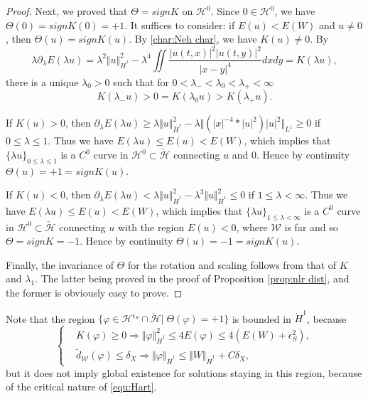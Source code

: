 \documentclass[reqno, 11pt]{amsart}
\numberwithin{equation}{section}
\theoremstyle{plain}
\theoremstyle{definition}
\numberwithin{equation}{section}
\numberwithin{theorem}{section}
\numberwithin{equation}{section}
\numberwithin{equation}{section}
\numberwithin{theorem}{section}
\begin{document}
\begin{proof}
		Next, we proved that $\Theta=signK$ on $\mathcal{H}^0$. Since $0\in \mathcal{H}^0$, we have $\Theta(0)=signK(0)=+1$. It suffices to consider: if $E(u)<E(W)$ and $u\neq0$, then $\Theta(u)=signK(u)$. By \eqref{char:Neh char}, we have $K(u)\neq0$. By 
		\begin{equation*}
		\lambda\partial_\lambda E(\lambda u)=\lambda^2\Vert u\Vert_{\dot H^1}^2-\lambda^4\iint \frac{\big|u(t,x)\big|^2\big|u(t,y)\big|^2}{|x-y|^4} dxdy=K(\lambda u),
		\end{equation*}
		there is a unique $\lambda_0>0$ such that for $0<\lambda_{-}<\lambda_0<\lambda_+<\infty$
		\begin{equation*}
		K(\lambda_{-}u)> 0=K(\lambda_0u) > K(\lambda_{+}u).
		\end{equation*}
		
		If $K(u)>0$, then $\partial_\lambda E(\lambda u)\geq \lambda\Vert u \Vert_{\dot H^1}^2-\lambda\Vert \left( |x|^{-4}*|u|^2\right)|u|^2\Vert_{L^1}\geq0$ if $0\leq\lambda\leq1$. Thus we have $E(\lambda u)\leq E(u)<E(W)$, which implies that $\{\lambda u \}_{0\leq\lambda\leq1}$ is a $C^0$ curve in $\mathcal{H}^0\subset \check{\mathcal{H}}$ connecting $u$ and 0. Hence by continuity $\Theta(u)=+1=signK(u)$.
		
		If $K(u)<0$, then $\partial_\lambda E(\lambda u)<\lambda\Vert u \Vert_{\dot H^1}^2-\lambda^3\Vert u \Vert_{\dot H^1}^2\leq0$ if $1\leq\lambda<\infty$. Thus we have $E(\lambda u)\leq E(u)<E(W)$, which implies that $\{\lambda u \}_{1\leq\lambda<\infty}$ is a $C^0$ curve in $\mathcal{H}^0\subset \check{\mathcal{H}}$ connecting $u$ with the region $E(u)<0$, where $\mathcal{W}$ is far and so $\Theta=signK=-1$. Hence by continuity $\Theta(u)=-1=signK(u)$.
		
		Finally, the invariance of $\Theta$ for the rotation and scaling follows from that of $K$ and $\lambda_{1}$. The latter being proved in the proof of Proposition \ref{prop:nlr dist}, and the former is obviously easy to prove.
	\end{proof}
	Note that the region $\{ \varphi \in \mathcal{H}^{\epsilon_S} \cap \check{\mathcal{H}}|\;\Theta(\varphi)=+1 \}$ is bounded in $\dot H^1$, because 
	\begin{equation}\label{unif bd Te+}
	\left\{\begin{aligned}
	&K(\varphi)\geq 0 \Longrightarrow \Vert \varphi\Vert_{\dot H^1}^2\leq4E(\varphi)\leq4(E(W)+\epsilon_{S}^2) ,\\
	&\widetilde{d}_{\mathcal{W}}(\varphi)\leq \delta_X \Longrightarrow \Vert \varphi\Vert_{\dot H^1}\leq \Vert W\Vert_{\dot H^1}+C\delta_{X} ,\end{aligned}\right.
	\end{equation}
	but it does not imply global existence for solutions staying in this region, because of the critical nature of \eqref{equ:Hart}.
	
\end{document}
